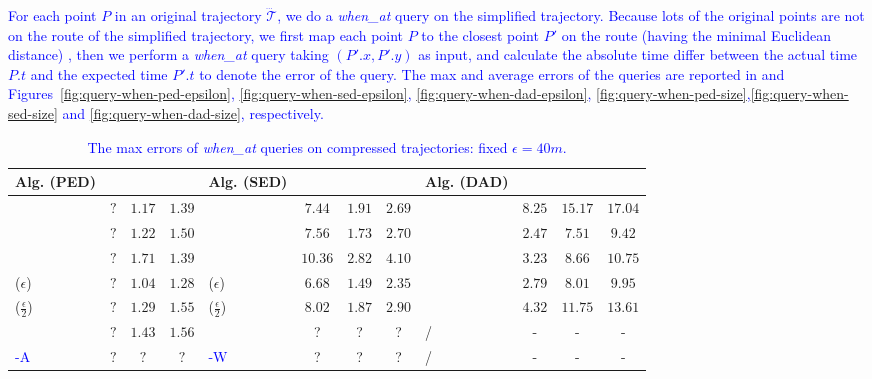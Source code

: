 {
\textcolor{blue}{For each point $P$ in an original trajectory $\dddot{\mathcal{T}}$, we do a \emph{when\_at} query on the simplified trajectory. Because lots of the original points are not on the route of the simplified trajectory, we first map each point $P$ to the closest point $P'$ on the route (having the minimal Euclidean distance) \cite{Cao:Spatio}, then we perform a \emph{when\_at} query taking $(P'.x, P'.y)$ as input, and calculate the absolute time differ between the actual time $P.t$ and the expected time $P'.t$ to denote the error of the query.}
%
\textcolor{blue}{The max and average errors of the queries are reported in  and Figures~\ref{fig:query-when-ped-epsilon}, \ref{fig:query-when-sed-epsilon}, \ref{fig:query-when-dad-epsilon}, \ref{fig:query-when-ped-size},\ref{fig:query-when-sed-size} and \ref{fig:query-when-dad-size}, respectively.}



\begin{table}
	\caption{\small \textcolor{blue}{The max errors of \emph{when\_at} queries on compressed trajectories: fixed $\epsilon=40m$.}}
	\centering
	\scriptsize
	\vspace{-1ex}
	\begin{tabular}{|l|c|c|c|l|c|c|c|l|c|c|c|}
		\hline
		\bf{Alg. (PED)}  &\ucar &\geolife &\mopsi & \bf{Alg. (SED)}  &\ucar &\geolife &\mopsi &\bf{Alg. (DAD)}  &\ucar &\geolife &\mopsi \\
		\hline
		{\dpa} &	$?$ & $ 1.17$ &	$1.39$	&\dpa &$7.44$ &$1.91$ & $2.69$ & \dpa	& $8.25$	& $15.17$	& $17.04$ \\
		\hline
		{\tpa} &	$?$ & $1.22$ &	$1.50 $	&\tpa 	& $7.56 $& $1.73 $ &$2.70$ & \tpa	& $2.47 $	& $ 	7.51 $	& $ 	9.42  $ \\
		\hline
		{\bqsa} &	$?$ & $1.71$ &	$1.39 $	&\squishe &$10.36 $ & $ 2.82 $ & $4.10$ & \opwa	& $3.23$	& $8.66$	& $10.75$ \\
		\hline
		{\siped($\epsilon$)} &	$?$ & $ 1.04$ &	$1.28 $	&\cised($\epsilon$) & $6.68 $ &$ 	1.49 $ &$ 	2.35$ & \interval	& $2.79 $	& $8.01$	& $9.95 $ \\
		\hline
		{\siped($\frac{\epsilon}{2}$)} &	$? $ & $1.29 $ &	$1.55 $ &\cised($\frac{\epsilon}{2}$) &$8.02  $ & $1.87$ & $2.90$& \intersec	& $4.32 $	& $11.75$	& $13.61 $ \\
		\hline
		{\operb} &	$? $ & $1.43 $ & $1.56 $	& \textcolor{blue}{\dagots} &? &? &? & /&- &- &- \\
		\hline
		\textcolor{blue}{\operb-A} &	${?} $ & ${?} $ & ${?} $	& \textcolor{blue}{\cised-W} &? &? &? & / &- &- &- \\
		\hline
	\end{tabular}
	\label{tab:query-when-me}
	\vspace{-1ex}
\end{table}


}
